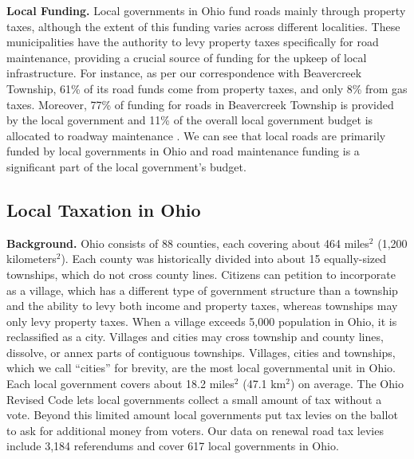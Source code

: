 {\bf Local Funding.} Local governments in Ohio fund roads mainly through property taxes, although the extent of this funding varies across different localities. These municipalities have the authority to levy property taxes specifically for road maintenance, providing a crucial source of funding for the upkeep of local infrastructure. For instance, as per our correspondence with Beavercreek Township, 61\% of its road funds come from property taxes, and only 8\% from gas taxes. Moreover, 77\% of funding for roads in Beavercreek Township is provided by the local government and 11\% of the overall local government budget is allocated to roadway maintenance \citep{schroeder2025}. We can see that local roads are primarily funded by local governments in Ohio and road maintenance funding is a significant part of the local government's budget.


\subsection{Local Taxation in Ohio}

{\bf Background.} Ohio consists of 88 counties, each covering about 464 miles$^2$ (1,200 kilometers$^2$). Each county was historically divided into about 15 equally-sized townships, which do not cross county lines. Citizens can petition to incorporate as a village, which has a different type of government structure than a township and the ability to levy both income and property taxes, whereas townships may only levy property taxes. When a village exceeds 5,000 population in Ohio, it is reclassified as a city. Villages and cities may cross township and county lines, dissolve, or annex parts of contiguous townships. Villages, cities and townships, which we call “cities” for brevity, are the most local governmental unit in Ohio. Each local government covers about 18.2 miles$^2$ (47.1 km$^2$) on average. The Ohio Revised Code lets local governments collect a small amount of tax without a vote. Beyond this limited amount local governments put tax levies on the ballot to ask for additional money from voters. Our data on renewal road tax levies include 3,184 referendums and cover 617 local governments in Ohio.


